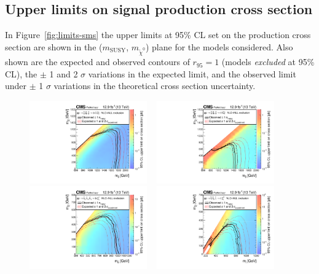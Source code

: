 \subsection{Upper limits on signal production cross section}
\label{sec:limits-sms}
In Figure~\ref{fig:limits-sms} the upper limits at 95\% CL set on the production cross section are shown
in the ($m_{\text{SUSY}}$, $m_{\tilde{\chi}^{0}}$) plane for the models considered.
Also shown are the expected and observed contours of $r_{95} = 1$ (models \emph{excluded}
at 95\% CL), the $\pm$ 1 and 2 $\sigma$ variations in the expected limit, and the observed limit under $\pm$ 1 $\sigma$ 
variations in the theoretical cross section uncertainty.

\begin{figure}[thp!]
  \begin{center}
    \includegraphics[width=0.45\textwidth]{./Figures/statisticalResults/SUS16T1bbbbXSEC.pdf} ~
    \includegraphics[width=0.45\textwidth]{./Figures/statisticalResults/SUS16T1ttttXSEC.pdf} \\
    \includegraphics[width=0.45\textwidth]{./Figures/statisticalResults/SUS16T2bbXSEC.pdf} ~
    \includegraphics[width=0.45\textwidth]{./Figures/statisticalResults/SUS16T2ttXSEC.pdf} 

\end{center}
\end{figure}
